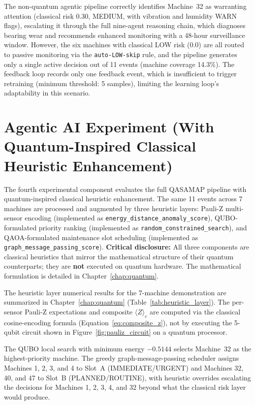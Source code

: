 The non-quantum agentic pipeline correctly identifies Machine~32 as warranting attention (classical risk 0.30, MEDIUM, with vibration and humidity WARN flags), escalating it through the full nine-agent reasoning chain, which diagnoses bearing wear and recommends enhanced monitoring with a 48-hour surveillance window. However, the six machines with classical LOW risk (0.0) are all routed to passive monitoring via the \texttt{auto-LOW-skip} rule, and the pipeline generates only a single active decision out of 11 events (machine coverage 14.3\%). The feedback loop records only one feedback event, which is insufficient to trigger retraining (minimum threshold: 5 samples), limiting the learning loop's adaptability in this scenario.

\section{Agentic AI Experiment (With Quantum-Inspired Classical Heuristic Enhancement)}

The fourth experimental component evaluates the full QASAMAP pipeline with quantum-inspired classical heuristic enhancement. The same 11 events across 7 machines are processed and augmented by three heuristic layers: Pauli-Z multi-sensor encoding (implemented as \texttt{energy\_distance\_anomaly\_score}), QUBO-formulated priority ranking (implemented as \texttt{random\_constrained\_search}), and QAOA-formulated maintenance slot scheduling (implemented as \texttt{graph\_message\_passing\_score}). \textbf{Critical disclosure:} All three components are classical heuristics that mirror the mathematical structure of their quantum counterparts; they are \textbf{not} executed on quantum hardware. The mathematical formulation is detailed in Chapter~\ref{chap:quantum}.

The heuristic layer numerical results for the 7-machine demonstration are summarized in Chapter~\ref{chap:quantum} (Table~\ref{tab:heuristic_layer}). The per-sensor Pauli-Z expectations and composite $\langle Z \rangle_c$ are computed via the classical cosine-encoding formula (Equation~\ref{eq:composite_z}), not by executing the 5-qubit circuit shown in Figure~\ref{fig:pauliz_circuit} on a quantum processor.

The QUBO local search with minimum energy $-0.5144$ selects Machine~32 as the highest-priority machine. The greedy graph-message-passing scheduler assigns Machines 1, 2, 3, and 4 to Slot~A (IMMEDIATE/URGENT) and Machines 32, 40, and 47 to Slot~B (PLANNED/ROUTINE), with heuristic overrides escalating the decisions for Machines 1, 2, 3, 4, and 32 beyond what the classical risk layer would produce.

